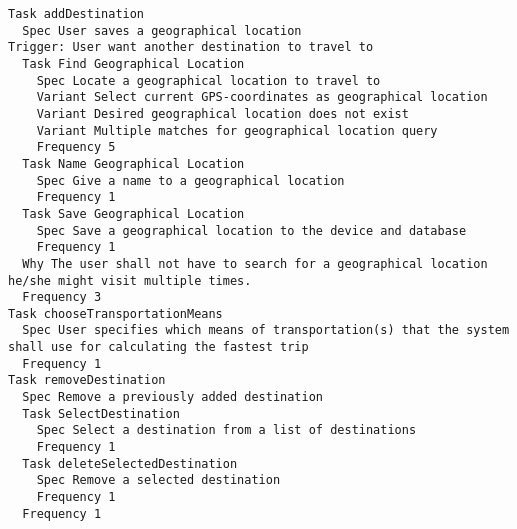 

\begin{lstlisting}
Task addDestination
  Spec User saves a geographical location
Trigger: User want another destination to travel to
  Task Find Geographical Location
    Spec Locate a geographical location to travel to
    Variant Select current GPS-coordinates as geographical location
    Variant Desired geographical location does not exist
    Variant Multiple matches for geographical location query
    Frequency 5
  Task Name Geographical Location
    Spec Give a name to a geographical location
    Frequency 1
  Task Save Geographical Location
    Spec Save a geographical location to the device and database
    Frequency 1
  Why The user shall not have to search for a geographical location he/she might visit multiple times.
  Frequency 3
Task chooseTransportationMeans
  Spec User specifies which means of transportation(s) that the system shall use for calculating the fastest trip
  Frequency 1
Task removeDestination
  Spec Remove a previously added destination
  Task SelectDestination
    Spec Select a destination from a list of destinations
    Frequency 1
  Task deleteSelectedDestination
    Spec Remove a selected destination
    Frequency 1
  Frequency 1

\end{lstlisting}